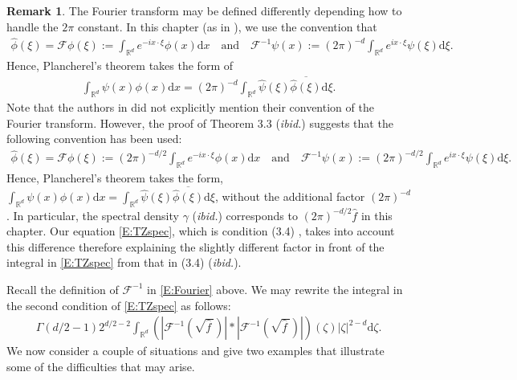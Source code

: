 \documentclass[12pt]{report}
\theoremstyle{plain}
\theoremstyle{definition}
\newtheorem{remark}[theorem]{Remark}
\numberwithin{equation}{section}
\newcommand{\R}{\mathbb{R}}
\newcommand{\ud}{\ensuremath{ \mathrm{d} }}
\begin{document}
\begin{remark} \label{R:Fourier}
	The Fourier transform may be defined differently depending how to handle the $2\pi$ constant. In
	this chapter (as in \cite{chen.kim:19:nonlinear,chen.huang:19:comparison}), we use the convention
	that
	\begin{align} \label{E:Fourier}
	\widehat{\phi}(\xi)      = \mathcal{F}\phi(\xi) := \int_{\R^d} e^{-i x\cdot\xi} \phi(x)\ud x \quad \text{and} \quad
	\mathcal{F}^{-1}\psi(x) := (2\pi)^{-d} \int_{\R^d} e^{i x\cdot\xi} \psi(\xi)\ud \xi.
	\end{align}
	Hence, Plancherel's theorem takes the form of
	\begin{align} \label{E:Plancherel}
	\int_{\R^d} \psi(x) \phi(x)\ud x = (2\pi)^{-d} \int_{\R^d} \widehat{\psi}(\xi) \overline{\widehat{\phi}(\xi)}\ud \xi.
	\end{align}
	Note that the authors in \cite{tessitore.zabczyk:98:invariant} did not explicitly mention their convention of the Fourier transform. However, the proof of Theorem 3.3 ({\it ibid.}) suggests that
	the following convention has been used:
	\begin{align*}
	\widehat{\phi}(\xi)      = \mathcal{F}\phi(\xi) := (2\pi)^{-d/2} \int_{\R^d} e^{-i x\cdot\xi} \phi(x)\ud x \quad \text{and} \quad
	\mathcal{F}^{-1}\psi(x) := (2\pi)^{-d/2} \int_{\R^d} e^{i x\cdot\xi} \psi(\xi)\ud \xi.
	\end{align*}
	Hence, Plancherel's theorem takes the form, $\int_{\R^d} \psi(x) \phi(x)\ud x = \int_{\R^d}
	\widehat{\psi}(\xi) \overline{\widehat{\phi}(\xi)}\ud \xi$, without the additional factor
	$(2\pi)^{-d}$. In particular, the spectral density $\gamma$ ({\it ibid.})
	corresponds to $\left(2\pi\right)^{-d/2}\widehat{f}$ in this chapter. Our equation \eqref{E:TZspec}, which is condition (3.4) \cite{tessitore.zabczyk:98:invariant}, takes into account this difference therefore explaining the slightly
	different factor in front of the integral in \eqref{E:TZspec} from that in (3.4) ({\it ibid.}).
\end{remark}

Recall the definition of $\mathcal{F}^{-1}$ in \eqref{E:Fourier} above. We may rewrite the integral in the second condition of \eqref{E:TZspec} as follows:
\begin{align*}
\Gamma(d/2 -1)2^{d/2-2} \int_{\R^d} \left(\left| \mathcal{F}^{-1}\left(\sqrt{ \widehat{f}\: }\right) \right| * \left| \mathcal{F}^{-1}\left(\sqrt{ \widehat{f}\: }\right)\right|\right) (\zeta) |\zeta|^{2-d} \ud \zeta.
\end{align*}
We now consider a couple of situations and give two examples that illustrate some of the difficulties that may arise. \bigskip
\end{document}

